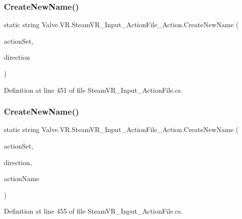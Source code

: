 \subsubsection{\texorpdfstring{CreateNewName()}{CreateNewName()}\hspace{0.1cm}{\footnotesize\ttfamily [1/2]}}
{\footnotesize\ttfamily static string Valve.\+V\+R.\+Steam\+V\+R\+\_\+\+Input\+\_\+\+Action\+File\+\_\+\+Action.\+Create\+New\+Name (\begin{DoxyParamCaption}\item[{string}]{action\+Set,  }\item[{string}]{direction }\end{DoxyParamCaption})\hspace{0.3cm}{\ttfamily [static]}}



Definition at line 451 of file Steam\+V\+R\+\_\+\+Input\+\_\+\+Action\+File.\+cs.

\mbox{\label{class_valve_1_1_v_r_1_1_steam_v_r___input___action_file___action_adfeade80d8f06f3dd347429073bce7d5}} 
\subsubsection{\texorpdfstring{CreateNewName()}{CreateNewName()}\hspace{0.1cm}{\footnotesize\ttfamily [2/2]}}
{\footnotesize\ttfamily static string Valve.\+V\+R.\+Steam\+V\+R\+\_\+\+Input\+\_\+\+Action\+File\+\_\+\+Action.\+Create\+New\+Name (\begin{DoxyParamCaption}\item[{string}]{action\+Set,  }\item[{\mbox{\hyperlink{namespace_valve_1_1_v_r_a1e6192cb5ddaf204afab87ccb5728780}{Steam\+V\+R\+\_\+\+Action\+Directions}}}]{direction,  }\item[{string}]{action\+Name }\end{DoxyParamCaption})\hspace{0.3cm}{\ttfamily [static]}}



Definition at line 455 of file Steam\+V\+R\+\_\+\+Input\+\_\+\+Action\+File.\+cs.

